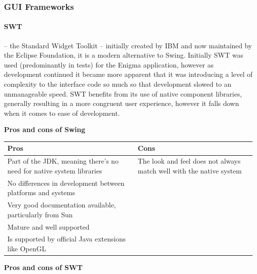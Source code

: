     \subsubsection{GUI Frameworks}
    
      \paragraph{SWT} -- the Standard Widget Toolkit -- initially created by IBM and now maintained by the Eclipse Foundation, it is a modern alternative to Swing. Initially SWT was used (predominantly in tests) for the Enigma application, however as development continued it became more apparent that it was introducing a level of complexity to the interface code so much so that development slowed to an unmanageable speed. SWT benefits from its use of native component libraries, generally resulting in a more congruent user experience, however it falls down when it comes to ease of development.
      
      \textbf{Pros and cons of Swing}
      
       \begin{center}
       \begin{tabular}{ | p{6cm} | p{6cm} |}
          \hline
          Pros & Cons \\ \hline \hline
          Part of the JDK, meaning there's no need for native system libraries & The look and feel does not always match well with the native system \\ \hline
          No differences in development between platforms and systems & \\ \hline
          Very good documentation available, particularly from Sun & \\ \hline
          Mature and well supported & \\ \hline
          Is supported by official Java extensions like OpenGL & \\
          \hline
        \end{tabular}
      \end{center}
      
      \textbf{Pros and cons of SWT}
      
